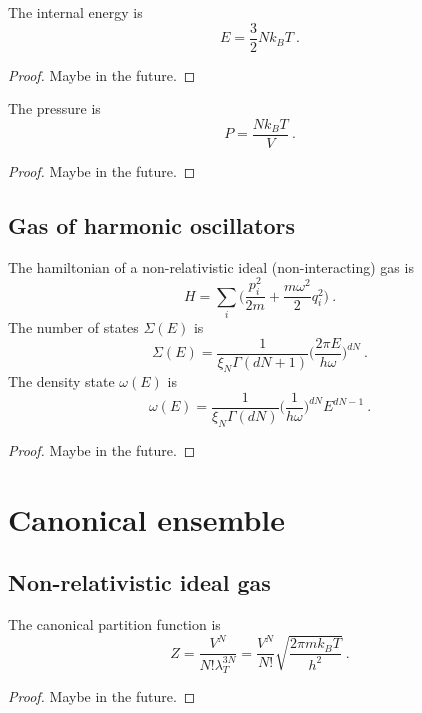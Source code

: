     The internal energy is 
    \begin{equation*}
        E = \frac{3}{2} N k_B T ~.
    \end{equation*}
    \begin{proof}
        Maybe in the future.
    \end{proof}

    The pressure is 
    \begin{equation*}
        P = \frac{N k_B T}{V} ~.
    \end{equation*}
    \begin{proof}
        Maybe in the future.
    \end{proof}

\section{Gas of harmonic oscillators}

    The hamiltonian of a non-relativistic ideal (non-interacting) gas is 
    \begin{equation*}
        H = \sum_i \Big( \frac{p^2_i}{2m} + \frac{m \omega^2}{2} q_i^2 \Big) ~.
    \end{equation*}
    The number of states $\Sigma(E)$ is 
    \begin{equation*}
        \Sigma(E) = \frac{1}{\xi_N \Gamma (dN + 1)} \Big ( \frac{2 \pi E}{h \omega} \Big)^{dN} ~.
    \end{equation*}
    The density state $\omega(E)$ is
    \begin{equation*}
        \omega (E) = \frac{1}{\xi_N \Gamma(dN)} \Big ( \frac{1}{h \omega}\Big)^{dN} E^{dN - 1} ~.
    \end{equation*}
    \begin{proof}
        Maybe in the future.
    \end{proof}

\chapter{Canonical ensemble}

\section{Non-relativistic ideal gas}

    The canonical partition function is 
    \begin{equation*}
        Z = \frac{V^N}{N! \lambda_T^{3N}} = \frac{V^N}{N!} \sqrt{\frac{2 \pi m k_B T}{h^2}} ~.
    \end{equation*}
    \begin{proof}
        Maybe in the future.
    \end{proof}
    
